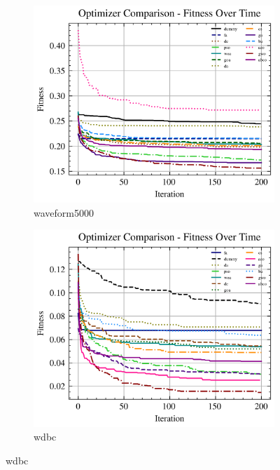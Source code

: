 \begin{figure}[htp]
    \begin{subfigure}[b]{0.45\textwidth}
        \includegraphics[width=\textwidth]{imagenes/fitness_charts/img/binary/waveform5000/optimizers_fitness_knn.png}
        \caption{waveform5000}
        \label{fig:convergencia_waveform5000_knn}
    \end{subfigure}
    \begin{subfigure}[b]{0.45\textwidth}
        \includegraphics[width=\textwidth]{imagenes/fitness_charts/img/binary/wdbc/optimizers_fitness_knn.png}
        \caption{wdbc}
        \label{fig:convergencia_wdbc_knn}
    \end{subfigure}


\end{figure}
